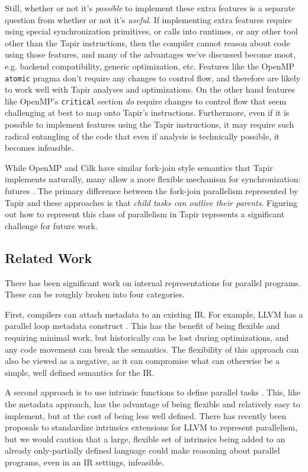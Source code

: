 \documentclass[sigconf]{acmart}
\begin{document}
Still, whether or not it's \emph{possible} to implement these extra features
is a separate question from whether or not it's \emph{useful}. If implementing
extra features require using special synchronization primitives, or calls into
runtimes, or any other tool other than the Tapir instructions, then the
compiler cannot reason about code using those features, and many of the
advantages we've discussed become moot, e.g. backend compatibility, generic 
optimization, etc. Features like the OpenMP \texttt{atomic} pragma don't 
require any changes to control flow, and therefore are likely to work well 
with Tapir analyses and optimizations. On the other hand features like OpenMP's
\texttt{critical} section \emph{do} require changes to control flow that seem
challenging at best to map onto Tapir's instructions. Furthermore, even if it
is possible to implement features using the Tapir instructions, it may require 
such radical entangling of the code that even if analysis is technically
possible, it becomes infeasible. 

While OpenMP and Cilk have similar fork-join style semantics that Tapir
implements naturally, many allow a more flexible mechanism for synchronization:
futures \cite{qthreads, hpx, chapel, charm++}. The primary difference
between the fork-join parallelism represented by Tapir and these approaches
is that \emph{child tasks can outlive their parents}. Figuring out how
to represent this class of parallelism in Tapir represents a significant
challenge for future work.

\subsection{Related Work} \label{Sec:Related}

There has been significant work on internal representations for parallel
programs. These can be roughly broken into four categories. 

First, compilers can attach metadata to an existing IR. For example, LLVM has a
parallel loop metadata construct \cite{}. This has the benefit of being
flexible and requiring minimal work, but historically can be lost during
optimizations, and any code movement can break the semantics. The flexibility
of this approach can also be viewed as a negative, as it can compromise
what can otherwise be a simple, well defined semantics for the IR. 

A second approach is to use intrinsic functions to define parallel tasks
\cite{ares}. This, like the metadata approach, has the advantage of being
flexible and relatively easy to implement, but at the cost of being less well
defined. There has recently been proposals to standardize intrinsics extensions
for LLVM to represent parallelism, but we would caution that a large, flexible
set of intrinsics being added to an already only-partially defined
\cite{verillvm} language could make reasoning about parallel programs, even
in an IR settings, infeasible. 
\end{document}
